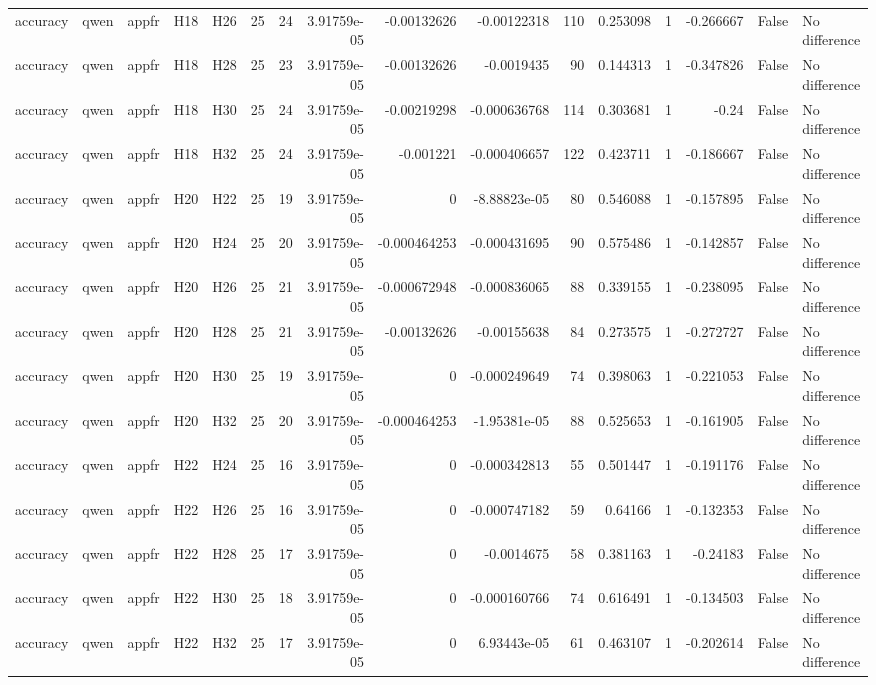 \begin{longtable}{lllllrrrrrrrrrrl}
accuracy & qwen & appfr & H18 & H26 & 25 & 24 & 3.91759e-05 & -0.00132626 & -0.00122318 & 110 & 0.253098 & 1 & -0.266667 & False & No difference \\
accuracy & qwen & appfr & H18 & H28 & 25 & 23 & 3.91759e-05 & -0.00132626 & -0.0019435 & 90 & 0.144313 & 1 & -0.347826 & False & No difference \\
accuracy & qwen & appfr & H18 & H30 & 25 & 24 & 3.91759e-05 & -0.00219298 & -0.000636768 & 114 & 0.303681 & 1 & -0.24 & False & No difference \\
accuracy & qwen & appfr & H18 & H32 & 25 & 24 & 3.91759e-05 & -0.001221 & -0.000406657 & 122 & 0.423711 & 1 & -0.186667 & False & No difference \\
accuracy & qwen & appfr & H20 & H22 & 25 & 19 & 3.91759e-05 & 0 & -8.88823e-05 & 80 & 0.546088 & 1 & -0.157895 & False & No difference \\
accuracy & qwen & appfr & H20 & H24 & 25 & 20 & 3.91759e-05 & -0.000464253 & -0.000431695 & 90 & 0.575486 & 1 & -0.142857 & False & No difference \\
accuracy & qwen & appfr & H20 & H26 & 25 & 21 & 3.91759e-05 & -0.000672948 & -0.000836065 & 88 & 0.339155 & 1 & -0.238095 & False & No difference \\
accuracy & qwen & appfr & H20 & H28 & 25 & 21 & 3.91759e-05 & -0.00132626 & -0.00155638 & 84 & 0.273575 & 1 & -0.272727 & False & No difference \\
accuracy & qwen & appfr & H20 & H30 & 25 & 19 & 3.91759e-05 & 0 & -0.000249649 & 74 & 0.398063 & 1 & -0.221053 & False & No difference \\
accuracy & qwen & appfr & H20 & H32 & 25 & 20 & 3.91759e-05 & -0.000464253 & -1.95381e-05 & 88 & 0.525653 & 1 & -0.161905 & False & No difference \\
accuracy & qwen & appfr & H22 & H24 & 25 & 16 & 3.91759e-05 & 0 & -0.000342813 & 55 & 0.501447 & 1 & -0.191176 & False & No difference \\
accuracy & qwen & appfr & H22 & H26 & 25 & 16 & 3.91759e-05 & 0 & -0.000747182 & 59 & 0.64166 & 1 & -0.132353 & False & No difference \\
accuracy & qwen & appfr & H22 & H28 & 25 & 17 & 3.91759e-05 & 0 & -0.0014675 & 58 & 0.381163 & 1 & -0.24183 & False & No difference \\
accuracy & qwen & appfr & H22 & H30 & 25 & 18 & 3.91759e-05 & 0 & -0.000160766 & 74 & 0.616491 & 1 & -0.134503 & False & No difference \\
accuracy & qwen & appfr & H22 & H32 & 25 & 17 & 3.91759e-05 & 0 & 6.93443e-05 & 61 & 0.463107 & 1 & -0.202614 & False & No difference \\

\end{longtable}
